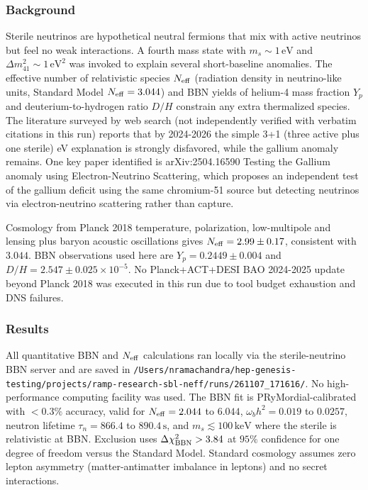 \documentclass[11pt,a4paper]{article}
\begin{document}
\subsubsection*{Background}
Sterile neutrinos are hypothetical neutral fermions that mix with active neutrinos but feel no weak interactions. A fourth mass state with $m_s \sim 1\,\mathrm{eV}$ and $\Delta m^2_{41} \sim 1\,\mathrm{eV}^2$ was invoked to explain several short-baseline anomalies. The effective number of relativistic species $N_{\rm eff}$ (radiation density in neutrino-like units, Standard Model $N_{\rm eff} = 3.044$) and BBN yields of helium-4 mass fraction $Y_p$ and deuterium-to-hydrogen ratio $D/H$ constrain any extra thermalized species. The literature surveyed by web search (not independently verified with verbatim citations in this run) reports that by 2024-2026 the simple 3+1 (three active plus one sterile) eV explanation is strongly disfavored, while the gallium anomaly remains. One key paper identified is arXiv:2504.16590 Testing the Gallium anomaly using Electron-Neutrino Scattering, which proposes an independent test of the gallium deficit using the same chromium-51 source but detecting neutrinos via electron-neutrino scattering rather than capture.

Cosmology from Planck 2018 temperature, polarization, low-multipole and lensing plus baryon acoustic oscillations gives $N_{\rm eff} = 2.99 \pm 0.17$, consistent with $3.044$. BBN observations used here are $Y_p = 0.2449 \pm 0.004$ and $D/H = 2.547 \pm 0.025 \times 10^{-5}$. No Planck+ACT+DESI BAO 2024-2025 update beyond Planck 2018 was executed in this run due to tool budget exhaustion and DNS failures.

\subsubsection*{Results}
All quantitative BBN and $N_{\rm eff}$ calculations ran locally via the sterile-neutrino BBN server and are saved in \texttt{/\allowbreak{}Users/\allowbreak{}nramachandra/\allowbreak{}hep-genesis-testing/\allowbreak{}projects/\allowbreak{}ramp-research-sbl-neff/\allowbreak{}runs/\allowbreak{}261107\_\allowbreak{}171616/\allowbreak{}}. No high-performance computing facility was used. The BBN fit is PRyMordial-calibrated with $<0.3\%$ accuracy, valid for $N_{\rm eff} = 2.044$ to $6.044$, $\omega_b h^2 = 0.019$ to $0.0257$, neutron lifetime $\tau_n = 866.4$ to $890.4\,\mathrm{s}$, and $m_s \lesssim 100\,\mathrm{keV}$ where the sterile is relativistic at BBN. Exclusion uses $\Delta\chi^2_{\rm BBN} > 3.84$ at $95\%$ confidence for one degree of freedom versus the Standard Model. Standard cosmology assumes zero lepton asymmetry (matter-antimatter imbalance in leptons) and no secret interactions.
\end{document}
